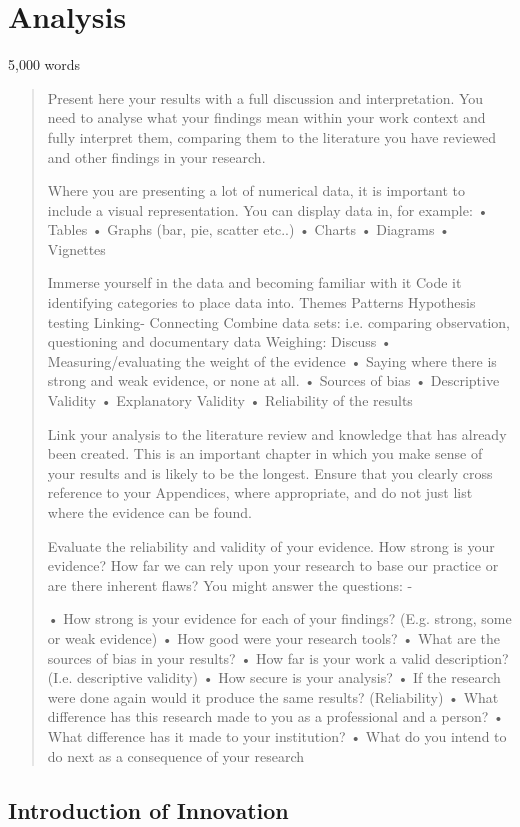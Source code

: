 \section{Analysis}
5,000 words
\begin{quote}
Present here your results with a full discussion and interpretation. You need to analyse what your findings mean within your work context and fully interpret them, comparing them to the literature you have reviewed and other findings in your research.

Where you are presenting a lot of numerical data, it is important to include a visual representation. You can display data in, for example:
•	Tables
•	Graphs (bar, pie, scatter etc..)
•	Charts 
•	Diagrams
•	Vignettes

Immerse yourself in the data and becoming familiar with it
Code it 	identifying categories to place data into.
Themes
Patterns
Hypothesis testing
Linking- Connecting
Combine data sets: i.e. comparing observation, questioning and documentary data
Weighing: Discuss
•	Measuring/evaluating the weight of the evidence
•	Saying where there is strong and weak evidence, or none at all. 
•	Sources of bias
•	Descriptive Validity
•	Explanatory Validity
•	Reliability of the results

Link your analysis to the literature review and knowledge that has already been created. This is an important chapter in which you make sense of your results and is likely to be the longest. Ensure that you clearly cross reference to your Appendices, where appropriate, and do not just list where the evidence can be found.

Evaluate the reliability and validity of your evidence. How strong is your evidence?  How far we can rely upon your research to base our practice or are there inherent flaws? You might answer the questions: -

•	How strong is your evidence for each of your findings? (E.g. strong, some or weak evidence) 
•	How good were your research tools?
•	What are the sources of bias in your results?
•	How far is your work a valid description? (I.e. descriptive validity)
•	How secure is your analysis? 
•	If the research were done again would it produce the same results? (Reliability)
•	What difference has this research made to you as a professional and a person?
•	What difference has it made to your institution?
•	What do you intend to do next as a consequence of your research
\end{quote}

\subsection{Introduction of Innovation}

